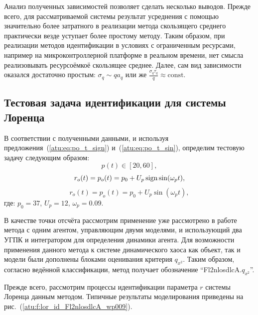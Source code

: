 Анализ полученных зависимостей позволяет сделать
несколько выводов. Прежде всего, для рассматриваемой системы
результат усреднения с помощью значительно более затратного
в реализации метода скользящего среднего практически везде
уступает более простому методу. Таким образом,
при реализации методов идентификации в условиях с ограниченным ресурсами,
например на микроконтроллерной платформе в реальном времени,
нет смысла реализовывать ресурсоёмкоё скользящее среднее.
Далее, сам вид зависимости оказался достаточно простым:
$ \sigma_q \sim q a_q $ или же
$ \frac{\sigma_q \tau_q}{q} \approx \mathrm{const}$.



\subsection{Тестовая задача идентификации для системы Лоренца}  %

В соответствии с полученными данными, и используя
предложения~(\ref{atu:eq:po_t_sign}) и~(\ref{atu:eq:po_t_sin}),
определим тестовую задачу следующим образом:
\[
  p(t) \in [20, 60],
\]
%
\begin{equation}
  r_o(t) = p_o(t) = p_0 +  U_{p} \operatorname*{sign} \sin( \omega_{p} t ),
  \label{atu:eq:lor_po_t_sign}
\end{equation}
%
%
\begin{equation}
  r_o(t) = p_o(t) = p_0 +  U_{p} \sin( \omega_{p} t ),
  \label{atu:eq:lor_po_t_sin}
\end{equation}
%
где:
$p_0 = 37$, $U_p=12$, $\omega_p=0.09$.

В качестве точки отсчёта рассмотрим применение уже рассмотрено в работе 
метода с одним агентом, управляющим двумя моделями,
и использующий два УГПК и интегратором для определения динамики агента.
Для возможности применения данного метода к системе динамического хаоса
как объект, так и модели были дополнены блоками оценивания критерия $q_{x^2}$.
Таким образом, согласно ведённой классификации,
метод получает обозначение
``Fl2nlosdlcA.$q_{x^2}$''.

Прежде всего, рассмотрим процессы идентификации параметра $r$
системы Лоренца данным методом. Типичные результаты моделирования
приведены на рис.~(\ref{atu:f:lor_id_Fl2nlosdlcA_wp009}).

